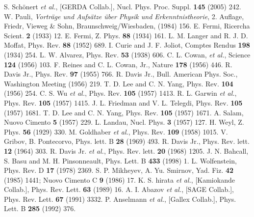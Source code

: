 \begin{thebibliography}{99}
 S. Sch\"onert \textit{et al.}, [GERDA Collab.], Nucl. Phys. Proc. Suppl. \textbf{145} (2005) 242.
W. Pauli, \emph{Vortr\"age und Aufs\"atze \"uber Physik     und Erkenntnistheorie}, 2. Auflage, Friedr, Vieweg \& Sohn,   Braunschweig/Wiesbaden, (1984) 156.
E. Fermi, Ricercha Scient. \textbf{2} (1933) 12.
E. Fermi, Z. Phys. \textbf{88} (1934) 161.
L. M. Langer and R. J. D. Moffat, Phys. Rev.   \textbf{88} (1952) 689.
I. Curie and J. F. Joliot, Comptes Rendus \textbf{198}   (1934) 254.
L. W. Alvarez, Phys. Rev. \textbf{53} (1938) 606.
 C. L. Cowan, \textit{et al.}, Science \textbf{124}   (1956) 103.
F. Reines and C. L. Cowan, Jr., Nature \textbf{178} (1956) 446.
R. Davis Jr., Phys. Rev. \textbf{97} (1955) 766.
R. Davis Jr., Bull. American Phys. Soc., Washington   Meeting (1956) 219.
T. D. Lee and C. N. Yang, Phys. Rev. \textbf{104}  
(1956) 254.
C. S. Wu \textit{et al.}, Phys. Rev. \textbf{105} (1957)  
1413.
R. L. Garwin \textit{et al.}, Phys. Rev. \textbf{105}  
(1957) 1415.
J. L. Friedman and V. L. Telegdi, Phys. Rev.  
\textbf{105} (1957) 1681.
T. D. Lee and C. N. Yang, Phys. Rev. \textbf{105}   (1957) 1671.
A. Salam, Nuovo Cimento \textbf{5} (1957) 229.
L. Landau, Nucl. Phys. \textbf{3} (1957) 127.
H. Weyl, Z. Phys. \textbf{56} (1929) 330.
M. Goldhaber \textit{et al.}, Phys. Rev. \textbf{109}   (1958) 1015.
V. Gribov, B. Pontecorvo, Phys. lett. B \textbf{28}   (1969) 493.
R. Davis Jr., Phys. Rev. lett. \textbf{12} (1964) 303.
R. Davis Jr. \textit{et al.}, Phys. Rev. lett.   \textbf{20} (1968) 1205.
J. N. Bahcall, S. Basu and M. H. Pinsonneault, Phys.   Lett. B \textbf{433} (1998) 1.
L. Wolfenstein, Phys. Rev. D \textbf{17} (1978) 2369.
S. P. Mikheyev, A. Yu. Smirnov, Yad. Fiz. \textbf{42}  
(1985) 1441; Nuovo Cimento C \textbf{9} (1986) 17.
K. S. hirata \textit{et al.}, [Kamiokande Collab.],   Phys. Rev. Lett. \textbf{63} (1989) 16.
A. I. Abazov \textit{et al.}, [SAGE Collab.], Phys.   Rev. Lett. \textbf{67} (1991) 3332.
P. Anselmann \textit{et al.}, [Gallex Collab.], Phys.   Lett. B \textbf{285} (1992) 376.

\end{thebibliography}
